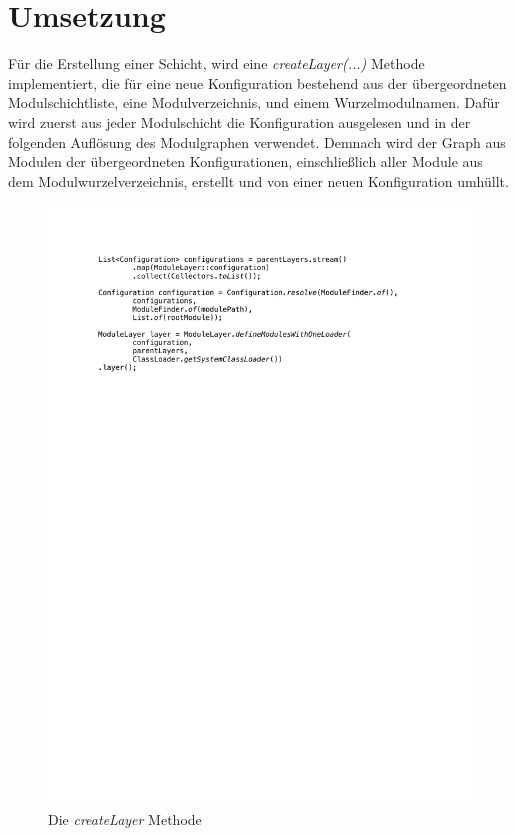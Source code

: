 \section{Umsetzung}\label{sec:umsetzung}
	Für die Erstellung einer Schicht, wird eine \textit{createLayer(...)} Methode implementiert, die für eine neue Konfiguration bestehend aus der übergeordneten Modulschichtliste, eine Modulverzeichnis, und  einem Wurzelmodulnamen.  Dafür wird zuerst aus jeder Modulschicht die Konfiguration ausgelesen und in der folgenden Auflösung des Modulgraphen verwendet. Demnach wird der Graph aus Modulen der übergeordneten Konfigurationen, einschließlich aller Module aus dem Modulwurzelverzeichnis, erstellt und von einer neuen Konfiguration umhüllt.\bigbreak
	\begin{figure}[h!]
		   \centering
		   \captionsetup{justification=centering}
		   \includegraphics[width=\textwidth]{material/images/umsetzung/configs.pdf}
		   \caption{Die \textit{createLayer} Methode}
		   \label{fig:layerCreation}
	\end{figure}
